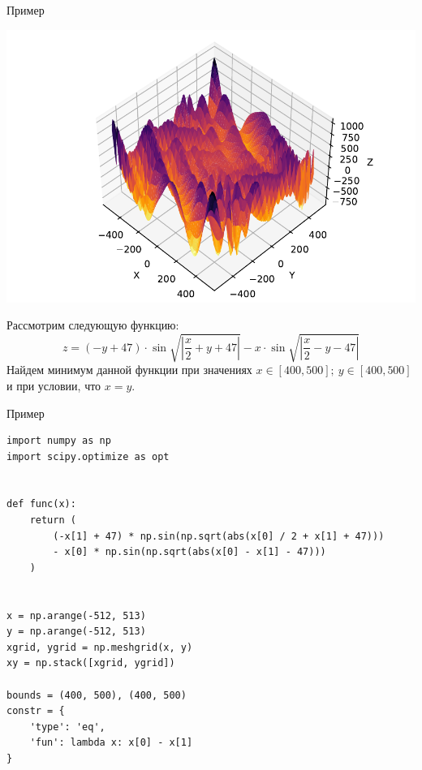 \documentclass[aspectratio=169, mathserif]{beamer}%
\begin{document}
\begin{frame}[fragile, label=c]{Пример}
\scriptsize
\begin{minipage}{.52\textwidth}
\includegraphics[width=.9\linewidth]{./pics/eggholder}
\end{minipage}
\begin{minipage}{.47\textwidth}
Рассмотрим следующую функцию:
\vfill
\begin{equation*}
z = \left(-y + 47\right) \cdot \sin \sqrt{\left|\dfrac{x}{2} + y + 47\right|} - x \cdot \sin \sqrt{\left|\dfrac{x}{2} - y - 47\right|}
\end{equation*}
\vfill
Найдем минимум данной функции при значениях $x \in \left[400, 500\right];\ y \in \left[400, 500\right]$ и при условии, что $x = y$.
\end{minipage}
\vfill
\end{frame}


\begin{frame}[fragile, label=c]{Пример}
\scriptsize
\begin{verbatim}
import numpy as np
import scipy.optimize as opt


def func(x):
    return (
        (-x[1] + 47) * np.sin(np.sqrt(abs(x[0] / 2 + x[1] + 47)))
        - x[0] * np.sin(np.sqrt(abs(x[0] - x[1] - 47)))
    )


x = np.arange(-512, 513)
y = np.arange(-512, 513)
xgrid, ygrid = np.meshgrid(x, y)
xy = np.stack([xgrid, ygrid])

bounds = (400, 500), (400, 500)
constr = {
    'type': 'eq',
    'fun': lambda x: x[0] - x[1]
}
\end{verbatim}
\vfill
\end{frame}
\end{document}
